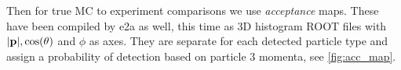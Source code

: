 \documentclass[a4paper,12pt]{article}
\newcommand{\verbb}[1]{\text{\Verb|#1|}}
\begin{document}
Then for true MC to experiment comparisons we use \emph{acceptance} maps.
These have been compiled by e2a as well, this time as 3D histogram ROOT files with $|\vb{p}|, \cos(\theta)$ and $\phi$ as axes.
They are separate for each detected particle type and assign a probability of detection based on particle 3 momenta, see \cref{fig:acc_map}.

\end{document}
